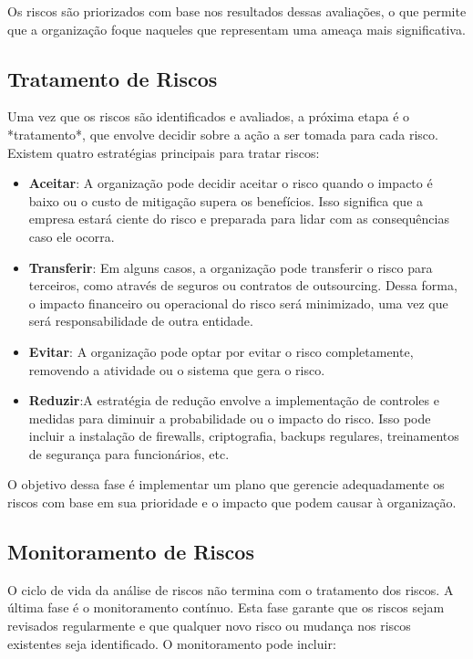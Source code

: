 \documentclass[12pt,oneside,a4paper,article]{abntex2}
\begin{document}
{Os riscos são priorizados com base nos resultados dessas avaliações, o que permite que a organização foque naqueles que representam uma ameaça mais significativa.}

\subsection{Tratamento de Riscos}

{Uma vez que os riscos são identificados e avaliados, a próxima etapa é o *tratamento*, que envolve decidir sobre a ação a ser tomada para cada risco. Existem quatro estratégias principais para tratar riscos:}

\begin{itemize}
    \item \textbf{Aceitar}: A organização pode decidir aceitar o risco quando o impacto é baixo ou o custo de mitigação supera os benefícios. Isso significa que a empresa estará ciente do risco e preparada para lidar com as consequências caso ele ocorra.
    \item \textbf{Transferir}: Em alguns casos, a organização pode transferir o risco para terceiros, como através de seguros ou contratos de outsourcing. Dessa forma, o impacto financeiro ou operacional do risco será minimizado, uma vez que será responsabilidade de outra entidade.
    \item \textbf{Evitar}: A organização pode optar por evitar o risco completamente, removendo a atividade ou o sistema que gera o risco.
    \item \textbf{Reduzir}:A estratégia de redução envolve a implementação de controles e medidas para diminuir a probabilidade ou o impacto do risco. Isso pode incluir a instalação de firewalls, criptografia, backups regulares, treinamentos de segurança para funcionários, etc.
\end{itemize}

{O objetivo dessa fase é implementar um plano que gerencie adequadamente os riscos com base em sua prioridade e o impacto que podem causar à organização.}

\subsection{Monitoramento de Riscos}
{O ciclo de vida da análise de riscos não termina com o tratamento dos riscos. A última fase é o monitoramento contínuo. Esta fase garante que os riscos sejam revisados regularmente e que qualquer novo risco ou mudança nos riscos existentes seja identificado. O monitoramento pode incluir:}
\end{document}
